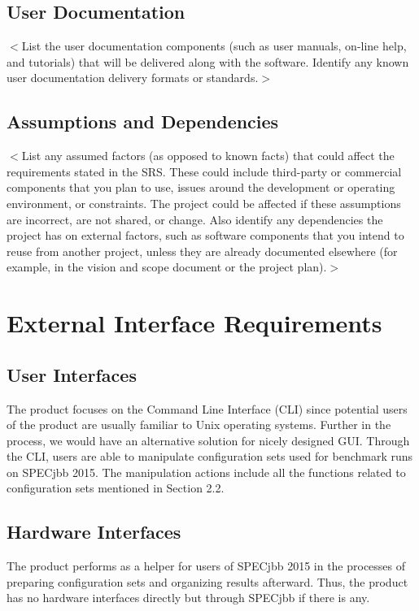 \documentclass{scrreprt}
\begin{document}
\section{User Documentation}
$<$List the user documentation components (such as user manuals, on-line help, 
and tutorials) that will be delivered along with the software. Identify any 
known user documentation delivery formats or standards.$>$

\section{Assumptions and Dependencies}
$<$List any assumed factors (as opposed to known facts) that could affect the 
requirements stated in the SRS. These could include third-party or commercial 
components that you plan to use, issues around the development or operating 
environment, or constraints. The project could be affected if these assumptions 
are incorrect, are not shared, or change. Also identify any dependencies the 
project has on external factors, such as software components that you intend to 
reuse from another project, unless they are already documented elsewhere (for 
example, in the vision and scope document or the project plan).$>$


\chapter{External Interface Requirements}

\section{User Interfaces}
The product focuses on the Command Line Interface (CLI) since potential users of the product are usually familiar to Unix operating systems. Further in the process, we would have an alternative solution for nicely designed GUI. Through the CLI, users are able to manipulate configuration sets used for benchmark runs on SPECjbb 2015. The manipulation actions include all the functions related to configuration sets mentioned in Section 2.2.

\section{Hardware Interfaces}
The product performs as a helper for users of SPECjbb 2015 in the processes of preparing configuration sets and organizing results afterward. Thus, the product has no hardware interfaces directly but through SPECjbb if there is any.
\end{document}

